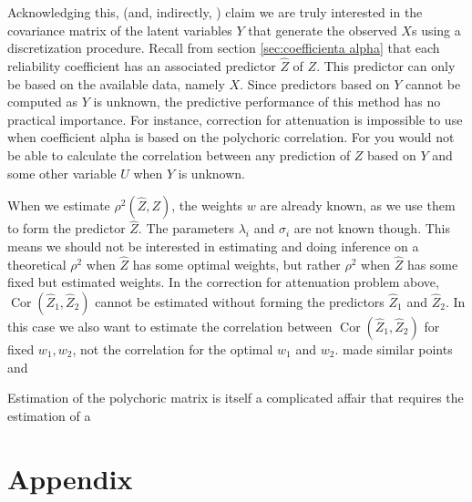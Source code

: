 \documentclass{article}
\theoremstyle{plain}
\theoremstyle{plain}
\theoremstyle{definition}
\theoremstyle{remark}
\theoremstyle{definition}
\theoremstyle{plain}
\theoremstyle{plain}
\theoremstyle{definition}
\DeclareMathOperator{\Cor}{Cor}
\begin{document}
Acknowledging this, \citet[][p.2]{Gadermann2012-jl} (and, indirectly, \citet{Zumbo2007-ap}) claim we are truly interested in the covariance matrix of the latent variables $Y$ that generate the observed $X$s using a discretization procedure. Recall from section \ref{sec:coefficienta alpha} that each reliability coefficient has an associated predictor $\hat{Z}$ of $Z$. This predictor can only be based on the available data, namely $X$. Since predictors based on $Y$ cannot be computed as $Y$ is unknown, the predictive performance of this method has no practical importance. For instance, correction for attenuation is impossible to use when coefficient alpha is based on the polychoric correlation. For you would not be able to calculate the correlation between any prediction of $Z$ based on $Y$ and some other variable $U$ when $Y$ is unknown.

When we estimate $\rho^{2}(\hat{Z},Z)$, the weights
$w$ are already known, as we use them to form the predictor $\hat{Z}$.
The parameters $\lambda_{i}$ and $\sigma_{i}$ are not known though.
This means we should not be interested in estimating and doing inference
on a theoretical $\rho^{2}$ when $\hat{Z}$ has some optimal
weights, but rather $\rho^{2}$ when $\hat{Z}$ has some fixed
but estimated weights. In the correction for attenuation problem
above, $\Cor(\hat{Z}_{1},\hat{Z}_{2})$ cannot
be estimated without forming the predictors $\hat{Z}_{1}$ and
$\hat{Z}_{2}$. In this case we also want to estimate the correlation
between $\Cor(\hat{Z}_{1},\hat{Z}_{2})$ for fixed
$w_{1},w_{2}$, not the correlation for the optimal $w_{1}$ and $w_{2}$. \citet{Chalmers2018-fj} made similar points and 

Estimation of the polychoric matrix is itself a complicated affair that requires the estimation of a  
\section{Appendix}
\end{document}
